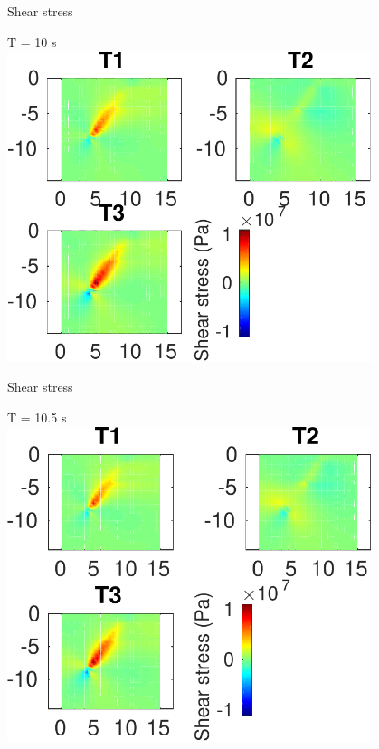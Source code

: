 \documentclass{beamer}
\begin{document}
\begin{frame}
 {Shear stress}
 
 \centering \Large T = 10 s\\
 \includegraphics[width=0.8\textwidth]{images/vertical_00106}
 
\end{frame}

\begin{frame}
 {Shear stress}
 
 \centering \Large T = 10.5 s\\
 \includegraphics[width=0.8\textwidth]{images/vertical_00111}
 
\end{frame}
\end{document}
